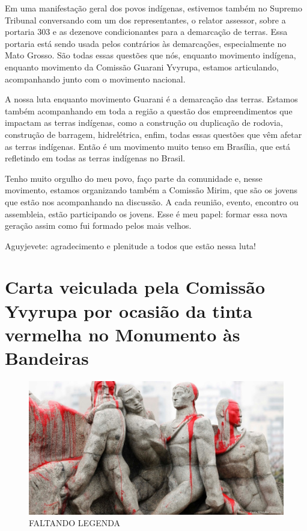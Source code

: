 Em uma manifestação geral dos povos indígenas, estivemos também no
Supremo Tribunal conversando com um dos representantes, o relator
assessor, sobre a portaria 303 e as dezenove condicionantes para a
demarcação de terras. Essa portaria está sendo usada pelos contrários
às demarcações, especialmente no Mato Grosso. São todas essas questões
que nós, enquanto movimento indígena, enquanto movimento da Comissão
Guarani Yvyrupa, estamos articulando, acompanhando junto com o
movimento nacional.

A nossa luta enquanto movimento Guarani é a demarcação das terras.
Estamos também acompanhando em toda a região a questão dos
empreendimentos que impactam as terras indígenas, como a construção ou
duplicação de rodovia, construção de barragem, hidrelétrica, enfim,
todas essas questões que vêm afetar as terras indígenas. Então é um
movimento muito tenso em Brasília, que está refletindo em todas as
terras indígenas no Brasil.

Tenho muito orgulho do meu povo, faço parte da comunidade e, nesse
movimento, estamos organizando também a Comissão Mirim, que são os
jovens que estão nos acompanhando na discussão. A cada reunião, evento,
encontro ou assembleia, estão participando os jovens. Esse é meu papel:
formar essa nova geração assim como fui formado pelos mais velhos. 

Aguyjevete: agradecimento e plenitude a todos que estão nessa luta!

\chapter{Carta veiculada pela Comissão Yvyrupa por ocasião da tinta
vermelha no Monumento às Bandeiras}

\begin{figure}
  \centering
 \includegraphics[width=\textwidth]{./img/GUARANIS-img2.jpg}	
  \hfill
  \caption{FALTANDO LEGENDA}
\end{figure}

